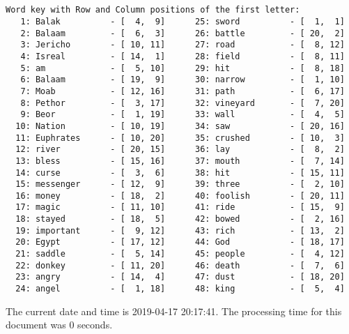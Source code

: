 \documentclass[12pt,a4paper,article]{memoir}\usepackage[]{graphicx}\usepackage[]{color}
\begin{document}
\begin{verbatim}


Word key with Row and Column positions of the first letter:
   1: Balak          - [  4,  9]      25: sword          - [  1,  1]
   2: Balaam         - [  6,  3]      26: battle         - [ 20,  2]
   3: Jericho        - [ 10, 11]      27: road           - [  8, 12]
   4: Isreal         - [ 14,  1]      28: field          - [  8, 11]
   5: am             - [  5, 10]      29: hit            - [  8, 18]
   6: Balaam         - [ 19,  9]      30: narrow         - [  1, 10]
   7: Moab           - [ 12, 16]      31: path           - [  6, 17]
   8: Pethor         - [  3, 17]      32: vineyard       - [  7, 20]
   9: Beor           - [  1, 19]      33: wall           - [  4,  5]
  10: Nation         - [ 10, 19]      34: saw            - [ 20, 16]
  11: Euphrates      - [ 10, 20]      35: crushed        - [ 10,  3]
  12: river          - [ 20, 15]      36: lay            - [  8,  2]
  13: bless          - [ 15, 16]      37: mouth          - [  7, 14]
  14: curse          - [  3,  6]      38: hit            - [ 15, 11]
  15: messenger      - [ 12,  9]      39: three          - [  2, 10]
  16: money          - [ 18,  2]      40: foolish        - [ 20, 11]
  17: magic          - [ 11, 10]      41: ride           - [ 15,  9]
  18: stayed         - [ 18,  5]      42: bowed          - [  2, 16]
  19: important      - [  9, 12]      43: rich           - [ 13,  2]
  20: Egypt          - [ 17, 12]      44: God            - [ 18, 17]
  21: saddle         - [  5, 14]      45: people         - [  4, 12]
  22: donkey         - [ 11, 20]      46: death          - [  7,  6]
  23: angry          - [ 14,  4]      47: dust           - [ 18, 20]
  24: angel          - [  1, 18]      48: king           - [  5,  4]

\end{verbatim}

\clearpage
The current date and time is 2019-04-17 20:17:41. The processing time for
this document was 0 seconds.
\end{document}
